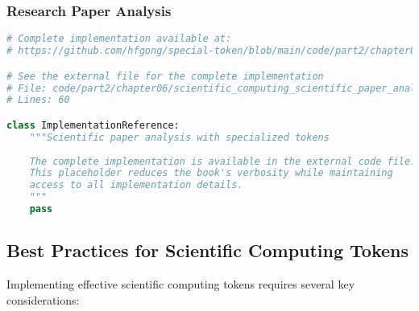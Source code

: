 \subsubsection{Research Paper Analysis}

\begin{lstlisting}[language=Python, caption={Scientific paper analysis with specialized tokens}]
# Complete implementation available at:
# https://github.com/hfgong/special-token/blob/main/code/part2/chapter06/scientific_computing_scientific_paper_analysis_with.py

# See the external file for the complete implementation
# File: code/part2/chapter06/scientific_computing_scientific_paper_analysis_with.py
# Lines: 60

class ImplementationReference:
    """Scientific paper analysis with specialized tokens
    
    The complete implementation is available in the external code file.
    This placeholder reduces the book's verbosity while maintaining
    access to all implementation details.
    """
    pass
\end{lstlisting}

\subsection{Best Practices for Scientific Computing Tokens}

Implementing effective scientific computing tokens requires several key considerations:

